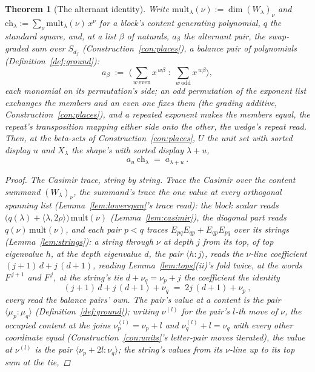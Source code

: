 \documentclass[11pt]{article}
\newtheorem{theorem}{Theorem}
\theoremstyle{definition}
\begin{document}
\begin{theorem}[The alternant identity]\label{thm:weylchar}
Write $\mathrm{mult}_\lambda(\nu):=\dim(W_\lambda)_\nu$ and
$\mathrm{ch}_\lambda:=\sum_\nu\mathrm{mult}_\lambda(\nu)\,x^\nu$ for a
block's content generating polynomial, $q$
the standard square, and, at a list $\beta$ of naturals, $a_\beta$ the
\emph{alternant pair}, the
swap-graded sum over $S_{d_f}$
(Construction~\ref{con:places}), a balance pair of polynomials
(Definition~\ref{def:ground}):
\[
a_\beta\;:=\;\Big\langle
\sum_{w\ \mathrm{even}}x^{\,w\beta}\;:\;
\sum_{w\ \mathrm{odd}}x^{\,w\beta}
\Big\rangle ,
\]
each monomial on its permutation's side; an odd permutation of the
exponent list exchanges the members and an even one fixes them (the
grading additive, Construction~\ref{con:places}), and a repeated
exponent makes the members equal, the repeat's transposition mapping
either side onto the other, the wedge's repeat read. Then, at the
beta-sets of Construction~\ref{con:places}, $U$ the unit set with
sorted display $u$ and $X_\lambda$ the shape's with sorted display
$\lambda+u$,
\[
a_{u}\ \mathrm{ch}_\lambda\;=\;a_{\lambda+u}\ .
\]
\begin{proof}
\emph{The Casimir trace, string by string.} Trace the Casimir over the
content summand $(W_\lambda)_\nu$, the summand's trace the one
value at every orthogonal spanning list (Lemma~\ref{lem:lowerspan}'s
trace read): the block scalar reads
$\big(q(\lambda)+\langle\lambda,2\rho\rangle\big)\,
\mathrm{mult}(\nu)$ (Lemma~\ref{lem:casimir}), the diagonal part reads
$q(\nu)\,\mathrm{mult}(\nu)$, and each pair $p<q$
traces $E_{pq}E_{qp}+E_{qp}E_{pq}$ over its strings
(Lemma~\ref{lem:strings}): a string through $\nu$ at depth $j$ from its
top, of top eigenvalue $h$, at the depth eigenvalue $d$, the pair
$\langle h\!:\!j\rangle$, reads the
$\nu$-line coefficient
$(j{+}1)\,d+j\,(d{+}1)$, reading
Lemma~\ref{lem:tops}(ii)'s fold twice, at the words $F^{\,j+1}$ and
$F^{\,j}$, at the string's tie
$d+\nu_q=\nu_p+j$ the coefficient the identity
\[
(j{+}1)\,d+j\,(d{+}1)+\nu_q\;=\;2j\,(d{+}1)+\nu_p\ ,
\]
every read the balance pairs' own.
The pair's value at a content is the pair
$\langle\mu_p\!:\!\mu_q\rangle$ (Definition~\ref{def:ground});
writing $\nu^{(l)}$ for the pair's $l$-th move of $\nu$, the
occupied content at the joins $\nu^{(l)}_p=\nu_p+l$ and
$\nu^{(l)}_q+l=\nu_q$ with every other coordinate equal
(Construction~\ref{con:units}'s letter-pair moves iterated), the
value at $\nu^{(l)}$ is the pair
$\langle\nu_p{+}2l\!:\!\nu_q\rangle$; the string's values from its
$\nu$-line up to its top sum at the tie,

\end{proof}
\end{theorem}
\end{document}
